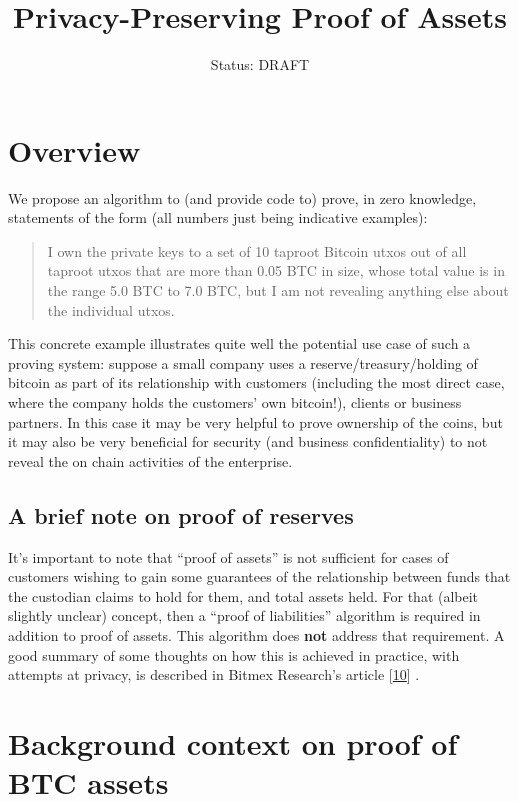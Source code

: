 \documentclass[10pt,a4paper]{article}
\author{Status: DRAFT}
\begin{document}
\title{Privacy-Preserving Proof of Assets}
\maketitle


\section{Overview}

We propose an algorithm to (and provide code to) prove, in zero knowledge, statements of the form (all numbers just being indicative examples):

\begin{quote}
I own the private keys to a set of 10 taproot Bitcoin utxos out of all taproot utxos that are more than 0.05 BTC in size, whose total value is in the range 5.0 BTC to 7.0 BTC, but I am not revealing anything else about the individual utxos.
\end{quote}

This concrete example illustrates quite well the potential use case of such a proving system: suppose a small company uses a reserve/treasury/holding of bitcoin as part of its relationship with customers (including the most direct case, where the company holds the customers' own bitcoin!), clients or business partners. In this case it may be very helpful to prove ownership of the coins, but it may also be very beneficial for security (and business confidentiality) to not reveal the on chain activities of the enterprise.

\subsection{A brief note on proof of reserves}

It's important to note that ``proof of assets'' is not sufficient for cases of customers wishing to gain some guarantees of the relationship between funds that the custodian claims to hold for them, and total assets held. For that (albeit slightly unclear) concept, then a ``proof of liabilities'' algorithm is required in addition to proof of assets. This algorithm does \textbf{not} address that requirement. A good summary of some thoughts on how this is achieved in practice, with attempts at privacy, is described in Bitmex Research's article {[}\protect\hyperlink{anchor-10}{10}{]} .

\vspace{5 pt}

\section{Background context on proof of BTC assets}
\end{document}
